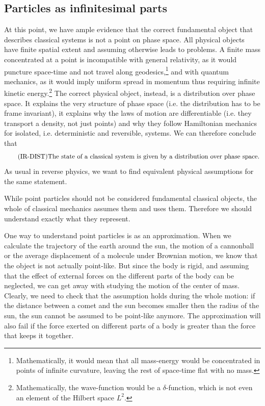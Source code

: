 \subsection{Particles as infinitesimal parts}
At this point, we have ample evidence that the correct fundamental object that describes classical systems is not a point on phase space. All physical objects have finite spatial extent and assuming otherwise leads to problems. A finite mass concentrated at a point is incompatible with general relativity, as it would puncture space-time and not travel along geodesics,\footnote{Mathematically, it would mean that all mass-energy would be concentrated in points of infinite curvature, leaving the rest of space-time flat with no mass.} and with quantum mechanics, as it would imply uniform spread in momentum thus requiring infinite kinetic energy.\footnote{Mathematically, the wave-function would be a $\delta$-function, which is not even an element of the Hilbert space $L^2$.} The correct physical object, instead, is a distribution over phase space. It explains the very structure of phase space (i.e. the distribution has to be frame invariant), it explains why the laws of motion are differentiable (i.e. they transport a density, not just points) and why they follow Hamiltonian mechanics for isolated, i.e. deterministic and reversible, systems. We can therefore conclude that
\begin{equation}\tag{IR-DIST}\label{rp-cm-ir-condDistributionOverPhaseSpace}
	\eqtext{The state of a classical system is given by a distribution over phase space.}
\end{equation}
As usual in reverse physics, we want to find equivalent physical assumptions for the same statement.

While point particles should not be considered fundamental classical objects, the whole of classical mechanics assumes them and uses them. Therefore we should understand exactly what they represent.

One way to understand point particles is as an approximation. When we calculate the trajectory of the earth around the sun, the motion of a cannonball or the average displacement of a molecule under Brownian motion, we know that the object is not actually point-like. But since the body is rigid, and assuming that the effect of external forces on the different parts of the body can be neglected, we can get away with studying the motion of the center of mass. Clearly, we need to check that the assumption holds during the whole motion: if the distance between a comet and the sun becomes smaller then the  radius of the sun, the sun cannot be assumed to be point-like anymore. The approximation will also fail if the force exerted on different parts of a body is greater than the force that keeps it together.

